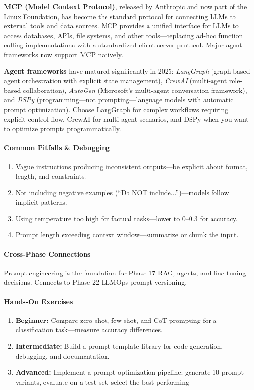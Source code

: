 \documentclass[11pt, a4paper, oneside]{report}
\begin{document}
\textbf{MCP (Model Context Protocol)}, released by Anthropic and now part of the Linux Foundation, has become the standard protocol for connecting LLMs to external tools and data sources. MCP provides a unified interface for LLMs to access databases, APIs, file systems, and other tools---replacing ad-hoc function calling implementations with a standardized client-server protocol. Major agent frameworks now support MCP natively.

\textbf{Agent frameworks} have matured significantly in 2025: \emph{LangGraph} (graph-based agent orchestration with explicit state management), \emph{CrewAI} (multi-agent role-based collaboration), \emph{AutoGen} (Microsoft's multi-agent conversation framework), and \emph{DSPy} (programming---not prompting---language models with automatic prompt optimization). Choose LangGraph for complex workflows requiring explicit control flow, CrewAI for multi-agent scenarios, and DSPy when you want to optimize prompts programmatically.

\paragraph{Common Pitfalls \& Debugging}
\begin{enumerate}[leftmargin=*]
\item Vague instructions producing inconsistent outputs---be explicit about format, length, and constraints.
\item Not including negative examples (``Do NOT include...'')---models follow implicit patterns.
\item Using temperature too high for factual tasks---lower to 0--0.3 for accuracy.
\item Prompt length exceeding context window---summarize or chunk the input.
\end{enumerate}

\paragraph{Cross-Phase Connections} Prompt engineering is the foundation for Phase 17 RAG, agents, and fine-tuning decisions. Connects to Phase 22 LLMOps prompt versioning.

\paragraph{Hands-On Exercises}
\begin{enumerate}[leftmargin=*]
\item \textbf{Beginner:} Compare zero-shot, few-shot, and CoT prompting for a classification task---measure accuracy differences.
\item \textbf{Intermediate:} Build a prompt template library for code generation, debugging, and documentation.
\item \textbf{Advanced:} Implement a prompt optimization pipeline: generate 10 prompt variants, evaluate on a test set, select the best performing.
\end{enumerate}
\end{document}
